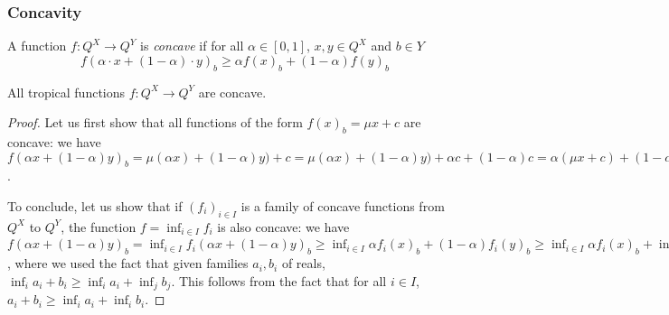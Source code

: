 \subsubsection{Concavity}


A function $f:Q^{X}\to Q^{Y}$ is \emph{concave} if for all $\alpha\in [0,1]$, $ x ,  y  \in Q^{X}$ and $b\in Y$ 
$$
f(\alpha\cdot  x +(1-\alpha)\cdot  y  )_{b} \geq \alpha f( x )_{b} + (1-\alpha)f( y  )_{b}
$$



\begin{proposition}
All tropical functions $f: Q^{X}\to Q^{Y}$ are concave.
\end{proposition}
\begin{proof}
Let us first show that all functions of the form $f( x )_{b}= \mu  x + c$ are concave:
we have $f(\alpha x + (1-\alpha) y  )_{b}= \mu(\alpha x )+(1-\alpha) y  )+c=
 \mu(\alpha x )+(1-\alpha) y  )+\alpha c+(1-\alpha)c=
 \alpha(\mu  x  + c)+(1-\alpha)(\mu  y  +c)=\alpha f( x )_{b}+(1-\alpha) f( x )_{b}$.


To conclude, let us show that if $(f_{i})_{i\in I}$ is a family of concave functions from $Q^{X}$ to $Q^{Y}$, the function $f=\inf_{i\in I}f_{i}$ is also concave: we have
$f(\alpha x  +(1-\alpha) y  )_{b}=
\inf_{i\in I}f_{i}(\alpha x +(1-\alpha) y  )_{b} \geq 
\inf_{i\in I}\alpha f_{i}( x )_{b}+(1-\alpha)f_{i}( y  )_{b}
\geq 
\inf_{i\in I}\alpha f_{i}( x )_{b} + \inf_{j\in I}(1-\alpha)f_{j}( y  )_{b}
=
\alpha \cdot (\inf_{i\in I}f_{i}( x )_{b})+ (1-\alpha)\cdot( \inf_{j\in I}f_{j}( y  )_{b})=
\alpha  f( x )_{b}+(1-\alpha)f( y  )_{b}$, where we used the fact that given families $a_{i},b_{i}$ of reals,
$\inf_{i}a_{i}+b_{i}\geq \inf_{i}a_{i}+\inf_{j}b_{j}$.
This follows from the fact that for all $i\in I$, $a_{i}+b_{i}\geq \inf_{i}a_{i}+\inf_{i}b_{i}$.
\end{proof}

